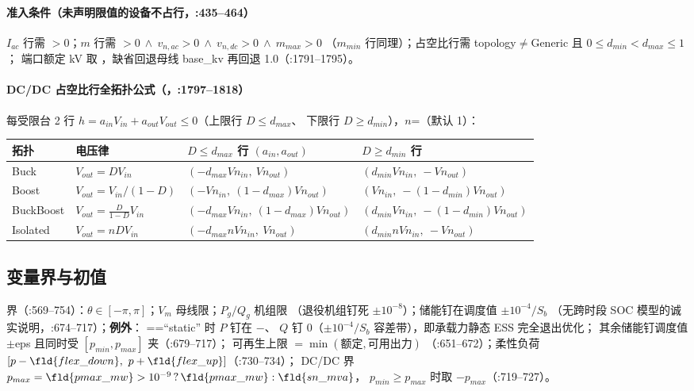 \paragraph{准入条件（未声明限值的设备不占行，:435--464）}
$I_{ac}$ 行需 $>0$；$m$ 行需
$>0\ \land\ v_{n,ac}>0\ \land\ v_{n,dc}>0\ \land\ m_{max}>0$
（$m_{min}$ 行同理）；占空比行需 topology$\ne$Generic 且 $0\le d_{min}<d_{max}\le1$；
端口额定 kV 取 ，缺省回退母线 base\_kv 再回退 1.0（:1791--1795）。

\paragraph{DC/DC 占空比行全拓扑公式（，:1797--1818）}
每受限台 2 行 $h=a_{in}V_{in}+a_{out}V_{out}\le0$（上限行 $D\le d_{max}$、
下限行 $D\ge d_{min}$），$n$=（默认 1）：
\begin{center}
\footnotesize
\begin{tabular}{@{}llll@{}}
\toprule
拓扑 & 电压律 & $D\le d_{max}$ 行 $(a_{in},a_{out})$ & $D\ge d_{min}$ 行\\
\midrule
Buck & $V_{out}=DV_{in}$ & $(-d_{max}Vn_{in},\ Vn_{out})$ & $(d_{min}Vn_{in},\ -Vn_{out})$\\
Boost & $V_{out}=V_{in}/(1-D)$ & $(-Vn_{in},\ (1-d_{max})Vn_{out})$ & $(Vn_{in},\ -(1-d_{min})Vn_{out})$\\
BuckBoost & $V_{out}=\tfrac{D}{1-D}V_{in}$ & $(-d_{max}Vn_{in},\ (1-d_{max})Vn_{out})$ & $(d_{min}Vn_{in},\ -(1-d_{min})Vn_{out})$\\
Isolated & $V_{out}=nDV_{in}$ & $(-d_{max}nVn_{in},\ Vn_{out})$ & $(d_{min}nVn_{in},\ -Vn_{out})$\\
\bottomrule
\end{tabular}
\end{center}

\subsection{变量界与初值}
界（:569--754）：$\theta\in[-\pi,\pi]$；$V_m$ 母线限；$P_g/Q_g$ 机组限
（退役机组钉死 $\pm10^{-8}$）；储能钉在调度值 $\pm10^{-4}/S_b$
（无跨时段 SOC 模型的诚实说明，:674--717）；\textbf{例外}：
==``static'' 时 $P$ 钉在 $-$、
$Q$ 钉 0（$\pm10^{-4}/S_b$ 容差带），即承载力静态 ESS 完全退出优化；
其余储能钉调度值 $\pm$eps 且同时受 $[p_{min},p_{max}]$ 夹（:679--717）；
可再生上限 $=\min(\text{额定},\text{可用出力})$
（:651--672）；柔性负荷 $[p-\fld{flex\_down},\ p+\fld{flex\_up}]$（:730--734）；
DC/DC 界 $p_{max}=\fld{pmax\_mw}>10^{-9}\,?\,\fld{pmax\_mw}:\fld{sn\_mva}$，
$p_{min}\ge p_{max}$ 时取 $-p_{max}$（:719--727）。

